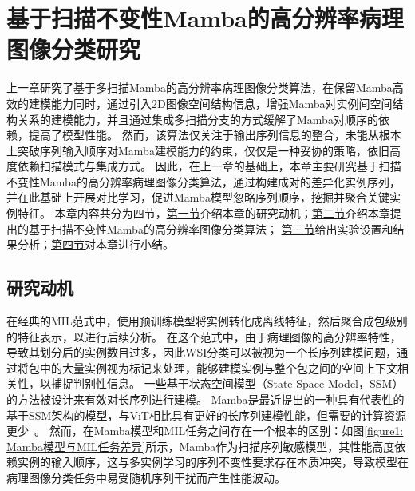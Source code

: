 \chapter[\hspace{0pt}基于扫描不变性Mamba的高分辨率病理图像分类研究]{{\heiti{}\hspace{0pt}基于扫描不变性Mamba的高分辨率病理图像分类研究}}\label{chapter4: 基于扫描不变性Mamba的高分辨率病理图像分类研究}
\removelofgap
\removelotgap

上一章研究了基于多扫描Mamba的高分辨率病理图像分类算法，在保留Mamba高效的建模能力同时，通过引入2D图像空间结构信息，增强Mamba对实例间空间结构关系的建模能力，并且通过集成多扫描分支的方式缓解了Mamba对顺序的依赖，提高了模型性能。
然而，该算法仅关注于输出序列信息的整合，未能从根本上突破序列输入顺序对Mamba建模能力的约束，仅仅是一种妥协的策略，依旧高度依赖扫描模式与集成方式。
因此，在上一章的基础上，本章主要研究基于扫描不变性Mamba的高分辨率病理图像分类算法，通过构建成对的差异化实例序列，并在此基础上开展对比学习，促进Mamba模型忽略序列顺序，挖掘并聚合关键实例特征。
本章内容共分为四节，\hyperref[section4: 研究动机]{第一节}介绍本章的研究动机；\hyperref[section4: 基于序列差异化对比的Mamba模型]{第二节}介绍本章提出的基于扫描不变性Mamba的高分辨率图像分类算法；
\hyperref[section4: 实验设置及结果分析]{第三节}给出实验设置和结果分析；\hyperref[section4: 本章小结]{第四节}对本章进行小结。



\section[\hspace{-2pt}研究动机]{{\heiti{} \hspace{-8pt}研究动机}}\label{section4: 研究动机}

在经典的MIL范式中，使用预训练模型将实例转化成离线特征，然后聚合成包级别的特征表示，以进行后续分析。
在这个范式中，由于病理图像的高分辨率特性，导致其划分后的实例数目过多，因此WSI分类可以被视为一个长序列建模问题，通过将包中的大量实例视为标记来处理，能够建模实例与整个包之间的空间上下文相关性，以捕捉判别性信息。
一些基于状态空间模型（State Space Model，SSM）的方法被设计来有效对长序列进行建模。
Mamba是最近提出的一种具有代表性的基于SSM架构的模型，与ViT相比具有更好的长序列建模性能，但需要的计算资源更少~\cite{zhu2024vision}。
然而，在Mamba模型和MIL任务之间存在一个根本的区别：如图\ref{figure1: Mamba模型与MIL任务差异}所示，Mamba作为扫描序列敏感模型，其性能高度依赖实例的输入顺序，这与多实例学习的序列不变性要求存在本质冲突，导致模型在病理图像分类任务中易受随机序列干扰而产生性能波动。

